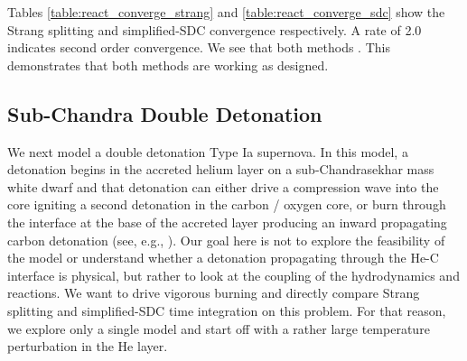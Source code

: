 \documentclass[linenumbers,trackchanges]{aastex631}
\newcommand{\MarginPar}[1]{\marginpar{\vskip-\baselineskip\raggedright\tiny\sffamily\hrule\smallskip{\color{red}#1}\par\smallskip\hrule}}
\begin{document}
Tables \ref{table:react_converge_strang} and
\ref{table:react_converge_sdc} show the Strang splitting and
simplified-SDC convergence respectively.        A rate
of 2.0 indicates second order convergence.  We see that both methods
.
This demonstrates that both methods are working as designed.

\subsection{Sub-Chandra Double Detonation}
\label{sec:dd}

We next model a double detonation Type Ia supernova.  In this model, a
detonation begins in the accreted helium layer on a sub-Chandrasekhar mass white
dwarf and that detonation can either drive a compression wave into the core
igniting a second detonation in the carbon / oxygen core, or burn through the
interface at the base of the accreted layer producing an inward propagating
carbon detonation (see, e.g., \citealt{fink:2007}).  Our goal here is not to
explore the feasibility of the model or understand whether a detonation
propagating through the He-C interface is physical, but rather to look at the
coupling of the hydrodynamics and reactions.  We want to drive vigorous burning
and directly compare Strang splitting and simplified-SDC time integration on this problem.
For that reason, we explore only a single model and start off with a rather
large temperature perturbation in the He layer.
\end{document}
